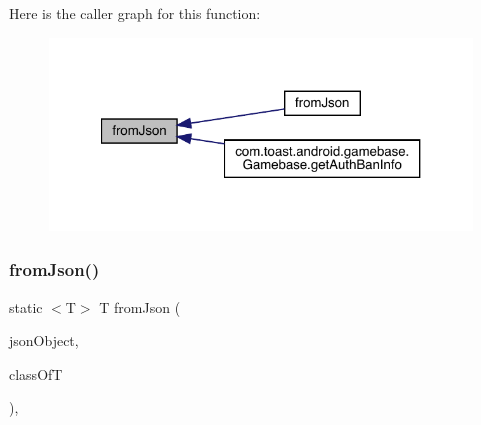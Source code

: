 Here is the caller graph for this function\+:
\nopagebreak
\begin{figure}[H]
\begin{center}
\leavevmode
\includegraphics[width=321pt]{classcom_1_1toast_1_1android_1_1gamebase_1_1base_1_1_value_object_ae6655c88c20a9a8406dc11b46250ac7b_icgraph}
\end{center}
\end{figure}
\mbox{\label{classcom_1_1toast_1_1android_1_1gamebase_1_1base_1_1_value_object_ab83c4196ee2e3f11553bbe0f04dc2101}} 
\subsubsection{\texorpdfstring{from\+Json()}{fromJson()}\hspace{0.1cm}{\footnotesize\ttfamily [2/3]}}
{\footnotesize\ttfamily static $<$T$>$ T from\+Json (\begin{DoxyParamCaption}\item[{@Non\+Null J\+S\+O\+N\+Object}]{json\+Object,  }\item[{Class$<$ T $>$}]{class\+OfT }\end{DoxyParamCaption})\hspace{0.3cm}{\ttfamily [static]}, {\ttfamily [inherited]}}

